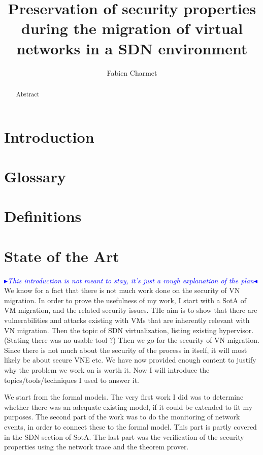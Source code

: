 \documentclass[a4paper, 11pt]{article}
\title{\LARGE \bf Preservation of security properties during the migration of virtual networks in a SDN environment}
\author{Fabien Charmet}
\newcommand{\boxedtext}[1]{\fbox{\scriptsize\bfseries\textsf{#1}}}
\newcommand{\myremark}[2]{
   \textcolor{blue}{\boxedtext{#1}
      {\small$\blacktriangleright$\emph{\textsl{#2}}$\blacktriangleleft$}
}}
\newcommand\FC[1]{\myremark{FC}{#1}}
\begin{document}
\maketitle

\begin{abstract}
Abstract
\end{abstract}

\tableofcontents
\listoffigures
 \listoftables
\thispagestyle{empty}

\newpage
\section{Introduction}

 
\section{Glossary}



\newpage
\section{Definitions}


\newpage
\section{State of the Art}
\FC{This introduction is not meant to stay, it's just a rough explanation of the plan}
We know for a fact that there is not much work done on the security of VN migration.
In order to prove the usefulness of my work, I start with a SotA of VM migration, and the related security issues.
THe aim is to show that there are vulnerabilities and attacks existing with VMs that are inherently relevant with VN migration.
Then the topic of SDN virtualization, listing existing hypervisor. (Stating there was no usable tool ?)
Then we go for the security of VN migration. Since there is not much about the security of the process in itself, it will most likely be about secure VNE etc.
We have now provided enough content to justify why the problem we work on is worth it.
Now I will introduce the topics/tools/techniques I used to answer it.

We start from the formal models. The very first work I did was to determine whether there was an adequate existing model, if it could be extended to fit my purposes. 
The second part of the work was to do the monitoring of network events, in order to connect these to the formal model. This part is partly covered in the SDN section of SotA.
The last part was the verification of the security properties using the network trace and the theorem prover.
\end{document}
